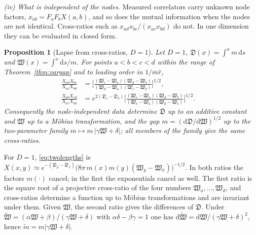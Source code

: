 \documentclass[11pt,a4paper]{article}
\makeatletter
\theoremstyle{stmt}
\newtheorem{proposition}[theorem]{Proposition}
\theoremstyle{defn}
\theoremstyle{rmk}
\renewenvironment{proof}[1][\proofname]{\par\pushQED{\qed}\normalfont\topsep6\p@\@plus6\p@\relax
  \trivlist\item[\hskip\labelsep{\sffamily\itshape\small #1.}]\ignorespaces}{\popQED\endtrivlist\@endpefalse}
\numberwithin{equation}{section}
\newcommand{\dd}{\mathrm{d}}
\makeatother
\begin{document}
\emph{(iv) What is independent of the nodes.} Measured correlators carry unknown node factors, $x_{ab}=F_aF_bX(a,b)$, and so does the mutual information when the nodes are not identical. Cross-ratios such as $x_{ad}x_{bc}/(x_{ac}x_{bd})$ do not. In one dimension they can be evaluated in closed form.

\begin{proposition}[Lapse from cross-ratios, $D=1$]\label{prop:crossratio}
Let $D=1$, $\mathfrak D(x)=\int^xm\,\dd s$ and $\mathfrak W(x)=\int^x\dd s/m$. For points $a<b<c<d$ within the range of Theorem~\ref{thm:vargap} and to leading order in $1/\bar m\hat r$,
\begin{equation}
\begin{aligned}
\frac{X_{ad}X_{bc}}{X_{ac}X_{bd}}&=\Big[\frac{(\mathfrak W_c-\mathfrak W_a)(\mathfrak W_d-\mathfrak W_b)}{(\mathfrak W_d-\mathfrak W_a)(\mathfrak W_c-\mathfrak W_b)}\Big]^{1/2},\\
\frac{X_{ab}X_{cd}}{X_{ac}X_{bd}}&=e^{2(\mathfrak D_c-\mathfrak D_b)}\Big[\frac{(\mathfrak W_c-\mathfrak W_a)(\mathfrak W_d-\mathfrak W_b)}{(\mathfrak W_b-\mathfrak W_a)(\mathfrak W_d-\mathfrak W_c)}\Big]^{1/2}.
\end{aligned}
\end{equation}
Consequently the node-independent data determine $\mathfrak D$ up to an additive constant and $\mathfrak W$ up to a M\"obius transformation, and the gap $m=(\dd\mathfrak D/\dd\mathfrak W)^{1/2}$ up to the two-parameter family $m\mapsto m\,|\gamma\mathfrak W+\delta|$; all members of the family give the same cross-ratios.
\end{proposition}

\begin{proof}
For $D=1$, \eqref{eq:twolengths} is $X(x,y)\simeq e^{-(\mathfrak D_y-\mathfrak D_x)}\big(8\pi\,m(x)m(y)(\mathfrak W_y-\mathfrak W_x)\big)^{-1/2}$. In both ratios the factors $m(\cdot)$ cancel; in the first the exponentials cancel as well. The first ratio is the square root of a projective cross-ratio of the four numbers $\mathfrak W_a,\dots,\mathfrak W_d$, and cross-ratios determine a function up to M\"obius transformations and are invariant under them. Given $\mathfrak W$, the second ratio gives the differences of $\mathfrak D$. Under $\tilde{\mathfrak W}=(\alpha\mathfrak W+\beta)/(\gamma\mathfrak W+\delta)$ with $\alpha\delta-\beta\gamma=1$ one has $\dd\tilde{\mathfrak W}=\dd\mathfrak W/(\gamma\mathfrak W+\delta)^2$, hence $\tilde m=m|\gamma\mathfrak W+\delta|$.
\end{proof}
\end{document}
